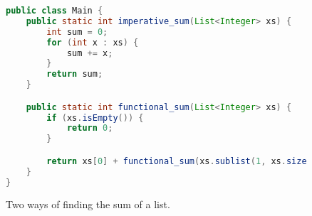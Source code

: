 \begin{figure}[htb]
    \centering
    \begin{lstlisting}[language=Java]
public class Main {
    public static int imperative_sum(List<Integer> xs) {
        int sum = 0;
        for (int x : xs) {
            sum += x;
        }
        return sum;
    }

    public static int functional_sum(List<Integer> xs) {
        if (xs.isEmpty()) {
            return 0;
        }

        return xs[0] + functional_sum(xs.sublist(1, xs.size()));
    }
}
\end{lstlisting}
    \caption{Two ways of finding the sum of a list.}
    \label{fig:imperative_vs_functional_example}
\end{figure}
